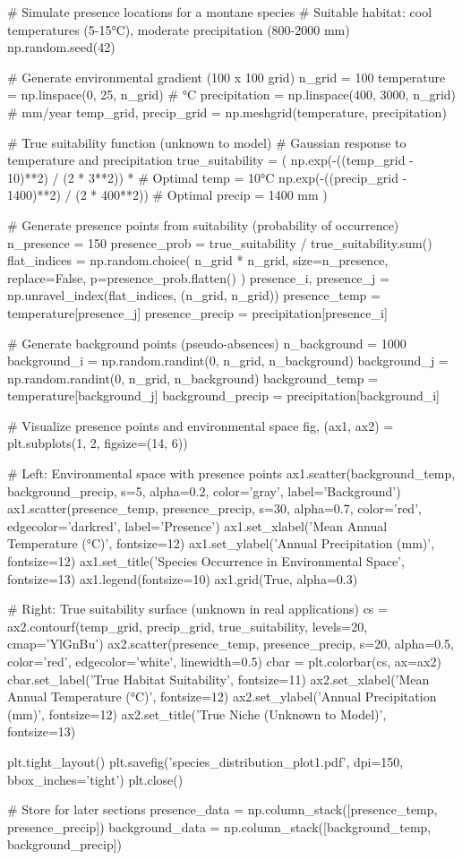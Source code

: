 \documentclass[11pt,a4paper]{article}
\begin{document}
\begin{pycode}
# Simulate presence locations for a montane species
# Suitable habitat: cool temperatures (5-15°C), moderate precipitation (800-2000 mm)
np.random.seed(42)

# Generate environmental gradient (100 x 100 grid)
n_grid = 100
temperature = np.linspace(0, 25, n_grid)  # °C
precipitation = np.linspace(400, 3000, n_grid)  # mm/year
temp_grid, precip_grid = np.meshgrid(temperature, precipitation)

# True suitability function (unknown to model)
# Gaussian response to temperature and precipitation
true_suitability = (
    np.exp(-((temp_grid - 10)**2) / (2 * 3**2)) *  # Optimal temp = 10°C
    np.exp(-((precip_grid - 1400)**2) / (2 * 400**2))  # Optimal precip = 1400 mm
)

# Generate presence points from suitability (probability of occurrence)
n_presence = 150
presence_prob = true_suitability / true_suitability.sum()
flat_indices = np.random.choice(
    n_grid * n_grid,
    size=n_presence,
    replace=False,
    p=presence_prob.flatten()
)
presence_i, presence_j = np.unravel_index(flat_indices, (n_grid, n_grid))
presence_temp = temperature[presence_j]
presence_precip = precipitation[presence_i]

# Generate background points (pseudo-absences)
n_background = 1000
background_i = np.random.randint(0, n_grid, n_background)
background_j = np.random.randint(0, n_grid, n_background)
background_temp = temperature[background_j]
background_precip = precipitation[background_i]

# Visualize presence points and environmental space
fig, (ax1, ax2) = plt.subplots(1, 2, figsize=(14, 6))

# Left: Environmental space with presence points
ax1.scatter(background_temp, background_precip, s=5, alpha=0.2,
           color='gray', label='Background')
ax1.scatter(presence_temp, presence_precip, s=30, alpha=0.7,
           color='red', edgecolor='darkred', label='Presence')
ax1.set_xlabel('Mean Annual Temperature (°C)', fontsize=12)
ax1.set_ylabel('Annual Precipitation (mm)', fontsize=12)
ax1.set_title('Species Occurrence in Environmental Space', fontsize=13)
ax1.legend(fontsize=10)
ax1.grid(True, alpha=0.3)

# Right: True suitability surface (unknown in real applications)
cs = ax2.contourf(temp_grid, precip_grid, true_suitability,
                 levels=20, cmap='YlGnBu')
ax2.scatter(presence_temp, presence_precip, s=20, alpha=0.5,
           color='red', edgecolor='white', linewidth=0.5)
cbar = plt.colorbar(cs, ax=ax2)
cbar.set_label('True Habitat Suitability', fontsize=11)
ax2.set_xlabel('Mean Annual Temperature (°C)', fontsize=12)
ax2.set_ylabel('Annual Precipitation (mm)', fontsize=12)
ax2.set_title('True Niche (Unknown to Model)', fontsize=13)

plt.tight_layout()
plt.savefig('species_distribution_plot1.pdf', dpi=150, bbox_inches='tight')
plt.close()

# Store for later sections
presence_data = np.column_stack([presence_temp, presence_precip])
background_data = np.column_stack([background_temp, background_precip])
\end{pycode}
\end{document}
